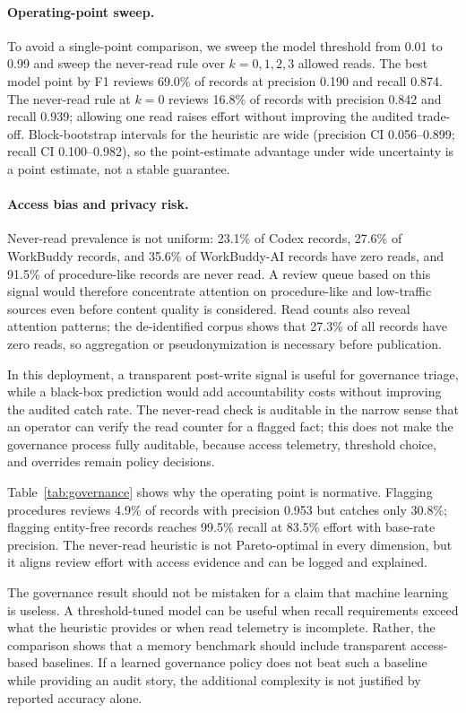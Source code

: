\documentclass[sigconf,nonacm]{acmart}
\begin{document}
\paragraph{Operating-point sweep.}
To avoid a single-point comparison, we sweep the model threshold from 0.01 to 0.99 and sweep the never-read rule over $k=0,1,2,3$ allowed reads. The best model point by F1 reviews 69.0\% of records at precision 0.190 and recall 0.874. The never-read rule at $k=0$ reviews 16.8\% of records with precision 0.842 and recall 0.939; allowing one read raises effort without improving the audited trade-off. Block-bootstrap intervals for the heuristic are wide (precision CI 0.056--0.899; recall CI 0.100--0.982), so the point-estimate advantage under wide uncertainty is a point estimate, not a stable guarantee.

\paragraph{Access bias and privacy risk.}
Never-read prevalence is not uniform: 23.1\% of Codex records, 27.6\% of WorkBuddy records, and 35.6\% of WorkBuddy-AI records have zero reads, and 91.5\% of procedure-like records are never read. A review queue based on this signal would therefore concentrate attention on procedure-like and low-traffic sources even before content quality is considered. Read counts also reveal attention patterns; the de-identified corpus shows that 27.3\% of all records have zero reads, so aggregation or pseudonymization is necessary before publication.

In this deployment, a transparent post-write signal is useful for governance triage, while a black-box prediction would add accountability costs without improving the audited catch rate. The never-read check is auditable in the narrow sense that an operator can verify the read counter for a flagged fact; this does not make the governance process fully auditable, because access telemetry, threshold choice, and overrides remain policy decisions.

Table~\ref{tab:governance} shows why the operating point is normative. Flagging procedures reviews 4.9\% of records with precision 0.953 but catches only 30.8\%; flagging entity-free records reaches 99.5\% recall at 83.5\% effort with base-rate precision. The never-read heuristic is not Pareto-optimal in every dimension, but it aligns review effort with access evidence and can be logged and explained.

The governance result should not be mistaken for a claim that machine learning is useless. A threshold-tuned model can be useful when recall requirements exceed what the heuristic provides or when read telemetry is incomplete. Rather, the comparison shows that a memory benchmark should include transparent access-based baselines. If a learned governance policy does not beat such a baseline while providing an audit story, the additional complexity is not justified by reported accuracy alone.
\end{document}
